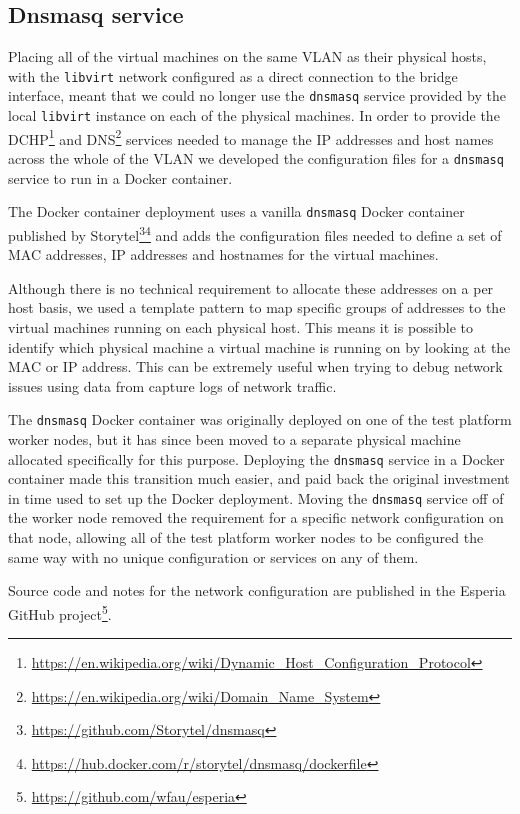 \documentclass{article}
\newcommand{\docker} {Docker\xspace}
\newcommand{\dnsmasq} {\texttt{dnsmasq}\xspace}
\newcommand{\dns} {DNS\xspace}
\newcommand{\dhcp} {DCHP\xspace}
\newcommand{\esperia} {Esperia\xspace}
\newcommand{\libvirt} {\texttt{libvirt}\xspace}
\newcommand{\github} {GitHub\xspace}
\newcommand{\vlan} {VLAN\xspace}
\newcommand{\testplatform} {test platform\xspace}
\newcommand{\footurl}[1] {\footnote{\url{#1}}}
\begin{document}
\subsection{Dnsmasq service}
\label{deployment-testbed.dnsmasq}

Placing all of the virtual machines on the same \vlan as their physical hosts, with the \libvirt network configured as a direct connection to the bridge interface, meant that we could no longer use the \dnsmasq service provided by the local \libvirt instance on each of the physical machines.
In order to provide the \dhcp\footurl{https://en.wikipedia.org/wiki/Dynamic_Host_Configuration_Protocol} and \dns\footurl{https://en.wikipedia.org/wiki/Domain_Name_System} services needed to manage the IP addresses and host names across the whole of the \vlan we developed the configuration files for a \dnsmasq service to run in a \docker container.

The \docker container deployment uses a vanilla \dnsmasq \docker container published by Storytel\footurl{https://github.com/Storytel/dnsmasq}\footurl{https://hub.docker.com/r/storytel/dnsmasq/dockerfile} and adds the configuration files needed to define a set of MAC addresses, IP addresses and hostnames for the virtual machines.

Although there is no technical requirement to allocate these addresses on a per host basis, we used a template pattern to map specific groups of addresses to the virtual machines running on each physical host.
This means it is possible to identify which physical machine a virtual machine is running on by looking at the MAC or IP address. This can be extremely useful when trying to debug network issues using data from capture logs of network traffic.

The \dnsmasq \docker container was originally deployed on one of the \testplatform worker nodes, but it has since been moved to a separate physical machine allocated specifically for this purpose.
Deploying the \dnsmasq service in a \docker container made this transition much easier, and paid back the original investment in time used to set up the \docker deployment.
Moving the \dnsmasq service off of the worker node removed the requirement for a specific network configuration on that node, allowing all of the \testplatform worker nodes to be configured the same way with no unique configuration or services on any of them.
 
Source code and notes for the network configuration are published in the \esperia \github project\footurl{https://github.com/wfau/esperia}.
\end{document}
